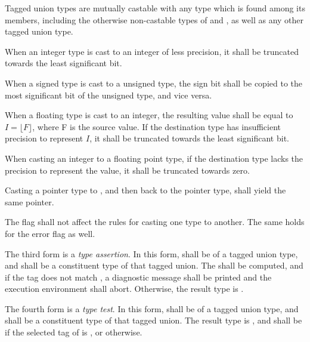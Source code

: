 \specsubsubitem
Tagged union types are mutually castable with any type which is found among its
members, including the otherwise non-castable types of  and
, as well as any other tagged union type.

\specsubsubitem
When an integer type is cast to an integer of less precision, it shall be
truncated towards the least significant bit.

\specsubsubitem
When a signed type is cast to a unsigned type, the sign bit shall be copied to
the most significant bit of the unsigned type, and vice versa.

\specsubsubitem
When a floating type is cast to an integer, the resulting value shall be equal
to $I = \lfloor F \rfloor$, where F is the source value. If the destination type
has insufficient precision to represent $I$, it shall be truncated towards the
least significant bit.

\specsubsubitem
When casting an integer to a floating point type, if the destination type
lacks the precision to represent the value, it shall be truncated towards zero.

\specsubsubitem
Casting a pointer type to , and then back to the pointer
type, shall yield the same pointer.


\specsubsubitem
The  flag shall not affect the rules for casting one type to
another. The same holds for the error flag as well.

\specsubsubitem
The third form is a \textit{type assertion}. In this form,
 shall be of a tagged union type, and
 shall be a constituent type of that tagged union. The
 shall be computed, and if the tag does not match
, a diagnostic message shall be printed and the execution
environment shall abort. Otherwise, the result type is .

\specsubsubitem
The fourth form is a \textit{type test}. In this form,
 shall be of a tagged union type, and
 shall be a constituent type of that tagged union. The result
type is , and shall be  if the selected tag of
 is , or 
otherwise.

